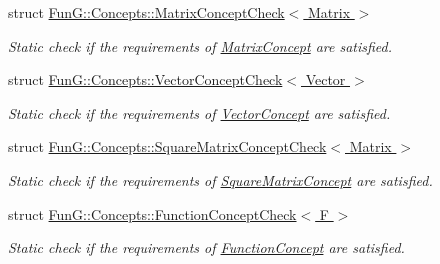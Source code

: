\begin{DoxyCompactItemize}
struct \hyperlink{structFunG_1_1Concepts_1_1MatrixConceptCheck}{Fun\+G\+::\+Concepts\+::\+Matrix\+Concept\+Check$<$ Matrix $>$}
\begin{DoxyCompactList}\small\item\em Static check if the requirements of \hyperlink{structFunG_1_1Concepts_1_1MatrixConcept}{Matrix\+Concept} are satisfied. \end{DoxyCompactList}\item 
struct \hyperlink{structFunG_1_1Concepts_1_1VectorConceptCheck}{Fun\+G\+::\+Concepts\+::\+Vector\+Concept\+Check$<$ Vector $>$}
\begin{DoxyCompactList}\small\item\em Static check if the requirements of \hyperlink{structFunG_1_1Concepts_1_1VectorConcept}{Vector\+Concept} are satisfied. \end{DoxyCompactList}\item 
struct \hyperlink{structFunG_1_1Concepts_1_1SquareMatrixConceptCheck}{Fun\+G\+::\+Concepts\+::\+Square\+Matrix\+Concept\+Check$<$ Matrix $>$}
\begin{DoxyCompactList}\small\item\em Static check if the requirements of \hyperlink{structFunG_1_1Concepts_1_1SquareMatrixConcept}{Square\+Matrix\+Concept} are satisfied. \end{DoxyCompactList}\item 
struct \hyperlink{structFunG_1_1Concepts_1_1FunctionConceptCheck}{Fun\+G\+::\+Concepts\+::\+Function\+Concept\+Check$<$ F $>$}
\begin{DoxyCompactList}\small\item\em Static check if the requirements of \hyperlink{structFunG_1_1Concepts_1_1FunctionConcept}{Function\+Concept} are satisfied. \end{DoxyCompactList}\end{DoxyCompactItemize}
